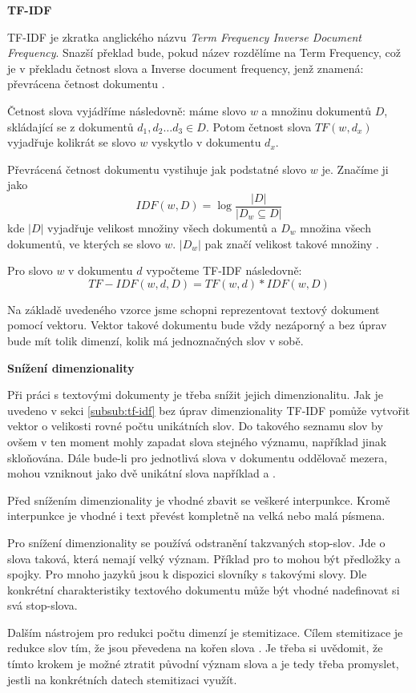 \documentclass[thesis=M,czech]{FITthesis}[2012/10/20]
\begin{document}
\begin{itemize}
		\textbf{TF-IDF}
			\label{subsub:tf-idf}
			
			TF-IDF je zkratka anglického názvu \textit{Term Frequency Inverse Document Frequency}. Snazší překlad bude, pokud název rozdělíme na Term Frequency, což je v překladu četnost slova a Inverse document frequency, jenž znamená: převrácena četnost dokumentu \cite{RamosTF-IDF}.
			
			Četnost slova vyjádříme následovně: máme slovo $w$ a množinu dokumentů $D$, skládající se z dokumentů $d_1, d_2 \ldots d_3 \in D$. Potom četnost slova $TF(w, d_x)$ vyjadřuje kolikrát se slovo $w$ vyskytlo v dokumentu $d_x$.
			
			Převrácená četnost dokumentu vystihuje jak podstatné slovo $w$ je. Značíme ji jako $$IDF(w,D) = \log{\frac{|D|}{|D_w \subseteq D|}}$$ kde $|D|$ vyjadřuje velikost množiny všech dokumentů a $D_w$ množina všech dokumentů, ve kterých se slovo $w$. $|D_w|$ pak značí velikost takové množiny \cite{RamosTF-IDF}.
			
			Pro slovo $w$ v dokumentu $d$ vypočteme TF-IDF následovně:
			$$TF-IDF(w,d,D) = TF(w,d) * IDF(w,D)$$
			
			Na základě uvedeného vzorce jsme schopni reprezentovat textový dokument pomocí vektoru. Vektor takové dokumentu bude vždy nezáporný a bez úprav bude mít tolik dimenzí, kolik má jednoznačných slov v sobě.
			
		\textbf{Snížení dimenzionality}
		
			Při práci s textovými dokumenty je třeba snížit jejich dimenzionalitu. Jak je uvedeno v sekci \ref{subsub:tf-idf} bez úprav dimenzionality TF-IDF pomůže vytvořit vektor o velikosti rovné počtu unikátních slov. Do takového seznamu slov by ovšem v ten moment mohly zapadat slova stejného významu, například jinak skloňována. Dále bude-li pro jednotlivá slova v dokumentu oddělovač mezera, mohou vzniknout jako dvě unikátní slova například  a .
			
			Před snížením dimenzionality je vhodné zbavit se veškeré interpunkce. Kromě interpunkce je vhodné i text převést kompletně na velká nebo malá písmena.
						
			Pro snížení dimenzionality se používá odstranění takzvaných stop-slov. Jde o slova taková, která nemají velký význam. Příklad pro to mohou být předložky a spojky. Pro mnoho jazyků jsou k dispozici slovníky s takovými slovy. Dle konkrétní charakteristiky textového dokumentu může být vhodné nadefinovat si svá stop-slova.
			
			Dalším nástrojem pro redukci počtu dimenzí je stemitizace. Cílem stemitizace je redukce slov tím, že jsou převedena na kořen slova \cite{textPreprop}. Je třeba si uvědomit, že tímto krokem je možné ztratit původní význam slova a je tedy třeba promyslet,  jestli na konkrétních datech stemitizaci využít.		
	\end{itemize}
		
\end{document}
